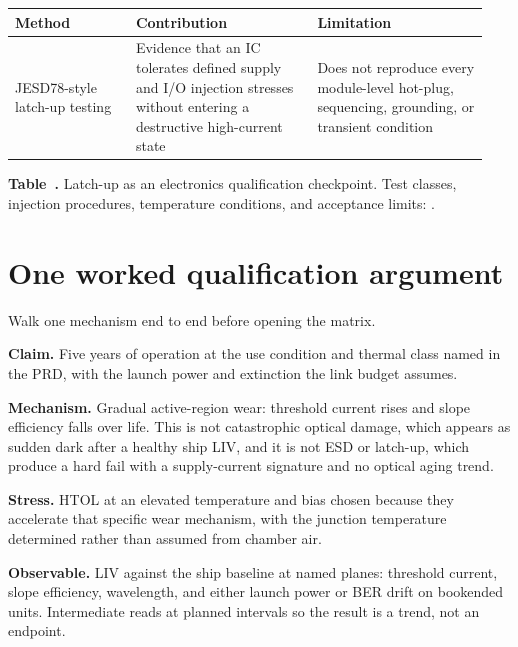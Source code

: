 \begin{table}[ht]
\label{tab:latchup-checkpoint}%
\centering
\setlength{\tabcolsep}{3pt}%
\footnotesize
\renewcommand{\arraystretch}{1.2}%
\begin{tabular}{@{}p{0.24\linewidth}p{0.36\linewidth}p{0.34\linewidth}@{}}
\toprule
Method & Contribution & Limitation \\
\midrule
JESD78-style latch-up testing & Evidence that an IC tolerates defined supply
and I/O injection stresses without entering a destructive high-current state &
Does not reproduce every module-level hot-plug, sequencing, grounding, or
transient condition \\
\bottomrule
\end{tabular}
\par\medskip
{\raggedright\footnotesize\textbf{Table~\thetable.} Latch-up as an electronics
qualification checkpoint. Test classes, injection procedures, temperature
conditions, and acceptance limits:
.\par}
\end{table}
\FloatBarrier

\section{One worked qualification argument}
\label{sec:qual-worked-laser}

Walk one mechanism end to end before opening the matrix.

\textbf{Claim.} Five years of operation at the use condition and thermal class
named in the PRD, with the launch power and extinction the link budget assumes.

\textbf{Mechanism.} Gradual active-region wear: threshold current rises and
slope efficiency falls over life. This is not catastrophic optical damage,
which appears as sudden dark after a healthy ship LIV, and it is not ESD or
latch-up, which produce a hard fail with a supply-current signature and no
optical aging trend.

\textbf{Stress.} HTOL at an elevated temperature and bias chosen because they
accelerate that specific wear mechanism, with the junction temperature
determined rather than assumed from chamber air.

\textbf{Observable.} LIV against the ship baseline at named planes: threshold
current, slope efficiency, wavelength, and either launch power or BER drift on
bookended units. Intermediate reads at planned intervals so the result is a
trend, not an endpoint.

